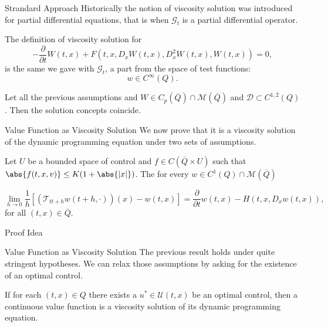 \documentclass[10pt, compress]{beamer}
\begin{document}
\begin{frame}{Strandard Approach}
    Historically the notion of viscosity solution was introduced for partial differential equations, that is when $\mathcal{G}_t$ is a partial differential operator.

    \vspace{5mm}

    The definition of viscosity solution for
    \begin{equation}\label{4-1-PDEwithW}
        -\frac{\partial}{\partial t}W(t,x) + F(t,x,D_xW(t,x),D_x^2W(t,x),W(t,x))=0,
    \end{equation}
    is the same we gave with $\mathcal{G}_t$, a part from the space of test functions:
    \[w \in C^{\infty}(Q).\]

    \begin{theorem}
        Let all the previous assumptions and $W\in C_p(\overline{Q})\cap\mathcal{M}(\overline{Q})$ and $\mathcal{D}\subset C^{1,2}(Q)$. Then the solution concepts coincide.
    \end{theorem}
\end{frame}

\begin{frame}{Value Function as Viscosity Solution}
    We now prove that it is a viscosity solution of the dynamic programming equation under two sets of assumptions.
    \begin{theorem}\label{4-1-viscodynamiceq}
    Let $U$ be a bounded space of control and $f\in C(\overline{Q}\times U)$ such that $\abs{f(t,x,v)}\leq K(1+\abs{|x|})$. The for every $w\in C^1(Q)\cap \mathcal{M}(\overline{Q})$ 

    \begin{equation}\label{4-1-viscodynamiceq-lim}
        \lim_{h\to 0} \frac{1}{h}\left[(\mathcal{T}_{tt+h}w(t+h,\cdot))(x)-w(t,x)\right] = \frac{\partial}{\partial t}w(t,x) - H(t,x,D_xw(t,x)),
    \end{equation}
    for all $(t,x)\in\overline{Q}$.
\end{theorem}
\end{frame}

\begin{frame}{Proof Idea}
    
\end{frame}

\begin{frame}{Value Function as Viscosity Solution}
    The previous result holds under quite stringent hypotheses. We can relax those assumptions by asking for the existence of an optimal control.

    \begin{theorem}
    If for each $(t,x)\in Q$ there exists a $u^{\ast}\in\mathcal{U}(t,x)$ be an optimal control, then a continuous value function is a viscosity solution of its dynamic programming equation.
    \end{theorem}
\end{frame}
\end{document}
